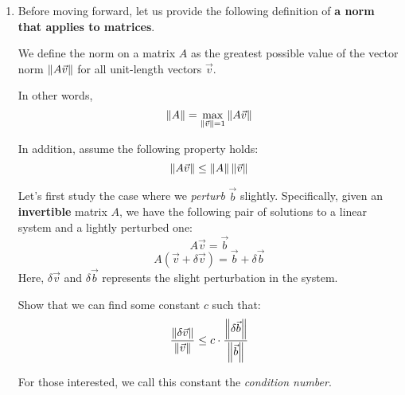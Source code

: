 \begin{enumerate}

    \item Before moving forward, let us provide the following definition of \textbf{a norm that applies to matrices}.

    We define the norm on a matrix $A$ as the greatest possible value of the vector norm $\left\lVert A\vec{v}\right\rVert$ for all unit-length vectors $\vec{v}$.

    In other words,
    $$\left\lVert A\right\rVert = \max _{\left\lVert\vec{v}\right\rVert = 1} \left\lVert A\vec{v}\right\rVert$$

    In addition, assume the following property holds:
    $$\left\lVert A\vec{v}\right\rVert \leq \left\lVert A\right\rVert \left\lVert\vec{v}\right\rVert$$

    Let's first study the case where we \textit{perturb} $\vec{b}$ slightly. Specifically, given an \textbf{invertible} matrix $A$, we have the following pair of solutions to a linear system and a lightly perturbed one:
    $$A\vec{v} = \vec{b}$$
    $$A(\vec{v} + \delta \vec{v}) = \vec{b} + \delta \vec{b}$$
    Here, $\delta \vec{v}$ and $\delta \vec{b}$ represents the slight perturbation in the system. 

    Show that we can find some constant $c$ such that:
    $$
    \frac{\left\lVert\delta \vec{v}\right\rVert}{\left\lVert\vec{v}\right\rVert} \leq c \cdot \frac{\left\lVert\delta \vec{b}\right\rVert}{\left\lVert\vec{b}\right\rVert}
    $$

    For those interested, we call this constant the \textit{condition number}.


\end{enumerate}
